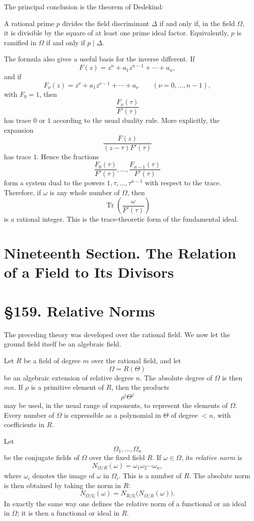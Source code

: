 \documentclass[12pt,a4paper]{article}
\newcommand{\webersection}[2]{\clearpage\section*{\S #1. #2}}
\newcommand{\booktitle}[1]{\clearpage\section*{#1}}
\newcommand{\Tr}{\operatorname{Tr}}
\begin{document}
The principal conclusion is the theorem of Dedekind:

A rational prime \(p\) divides the field discriminant \(\Delta\) if and only if, in the field \(\Omega\), it is divisible by the square of at least one prime ideal factor.  Equivalently, \(p\) is ramified in \(\Omega\) if and only if \(p\mid\Delta\).

The formula also gives a useful basis for the inverse different.  If
\[
  F(z)=z^n+a_1z^{n-1}+\cdots+a_n,
\]
and if
\[
  F_\nu(z)=z^\nu+a_1z^{\nu-1}+\cdots+a_\nu
  \qquad (\nu=0,\ldots,n-1),
\]
with \(F_0=1\), then
\[
  \frac{F_\nu(\tau)}{F'(\tau)}
\]
has trace \(0\) or \(1\) according to the usual duality rule.  More explicitly, the expansion
\[
  \frac{F(z)}{(z-\tau)F'(\tau)}
\]
has trace \(1\).  Hence the fractions
\[
  \frac{F_0(\tau)}{F'(\tau)},\ldots,
  \frac{F_{n-1}(\tau)}{F'(\tau)}
\]
form a system dual to the powers \(1,\tau,\ldots,\tau^{n-1}\) with respect to the trace.  Therefore, if \(\omega\) is any whole number of \(\Omega\), then
\[
  \Tr\!\left(\frac{\omega}{F'(\tau)}\right)
\]
is a rational integer.  This is the trace-theoretic form of the fundamental ideal.

\booktitle{Nineteenth Section. The Relation of a Field to Its Divisors}

\webersection{159}{Relative Norms}

The preceding theory was developed over the rational field.  We now let the ground field itself be an algebraic field.

Let \(R\) be a field of degree \(m\) over the rational field, and let
\[
  \Omega=R(\Theta)
\]
be an algebraic extension of relative degree \(n\).  The absolute degree of \(\Omega\) is then \(mn\).  If \(\rho\) is a primitive element of \(R\), then the products
\[
  \rho^i\Theta^j
\]
may be used, in the usual range of exponents, to represent the elements of \(\Omega\).  Every number of \(\Omega\) is expressible as a polynomial in \(\Theta\) of degree \(<n\), with coefficients in \(R\).

Let
\[
  \Omega_1,\ldots,\Omega_n
\]
be the conjugate fields of \(\Omega\) over the fixed field \(R\).  If \(\omega\in\Omega\), its \emph{relative norm} is
\[
  N_{\Omega/R}(\omega)=\omega_1\omega_2\cdots\omega_n,
\tag{1}
\]
where \(\omega_i\) denotes the image of \(\omega\) in \(\Omega_i\).  This is a number of \(R\).  The absolute norm is then obtained by taking the norm in \(R\):
\[
  N_{\Omega/\mathbb Q}(\omega)
     =N_{R/\mathbb Q}\bigl(N_{\Omega/R}(\omega)\bigr).
\tag{2}
\]
In exactly the same way one defines the relative norm of a functional or an ideal in \(\Omega\); it is then a functional or ideal in \(R\).
\end{document}
